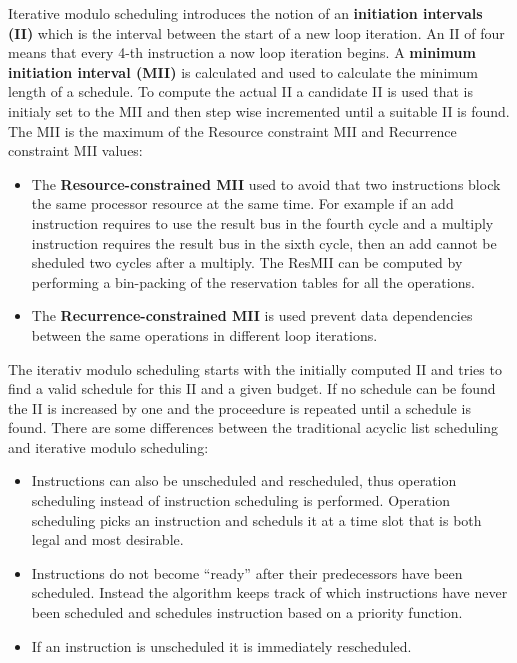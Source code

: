 \documentclass[a4paper,10pt]{article}
\begin{document}
Iterative modulo scheduling introduces the notion of an \textbf{initiation intervals (II)} which is the interval between the start of a
new loop iteration. An II of four means that every 4-th instruction a now loop iteration begins. A \textbf{minimum initiation interval
(MII)} is calculated and used to calculate the minimum length of a schedule. To compute the actual II a
candidate II is used that is initialy set to the MII and then step wise incremented until a suitable II is found. The MII is the maximum
of the Resource constraint MII and Recurrence constraint MII values:

\begin{itemize}
 \item The \textbf{Resource-constrained MII} used to avoid that two instructions block the same processor resource at the same time. For
       example if an add instruction requires to use the result bus in the fourth cycle and a multiply instruction requires the result bus
       in the sixth cycle, then an add cannot be sheduled two cycles after a multiply. The ResMII can be computed by performing a
       bin-packing of the reservation tables for all the operations.
 \item The \textbf{Recurrence-constrained MII} is used prevent data dependencies between the same operations in different loop iterations.
\end{itemize}

The iterativ modulo scheduling starts with the initially computed II and tries to find a valid schedule for this II and a given budget. If
no schedule can be found the II is increased by one and the proceedure is repeated until a schedule is found. There are some differences
between the traditional acyclic list scheduling and iterative modulo scheduling:
\begin{itemize}
 \item Instructions can also be unscheduled and rescheduled, thus operation scheduling instead of instruction scheduling is performed.
       Operation scheduling picks an instruction and scheduls it at a time slot that is both legal and most desirable.
 \item Instructions do not become ``ready'' after their predecessors have been scheduled. Instead the algorithm keeps track of which
       instructions have never been scheduled and schedules instruction based on a priority function.
 \item If an instruction is unscheduled it is immediately rescheduled.
\end{itemize}
\end{document}
